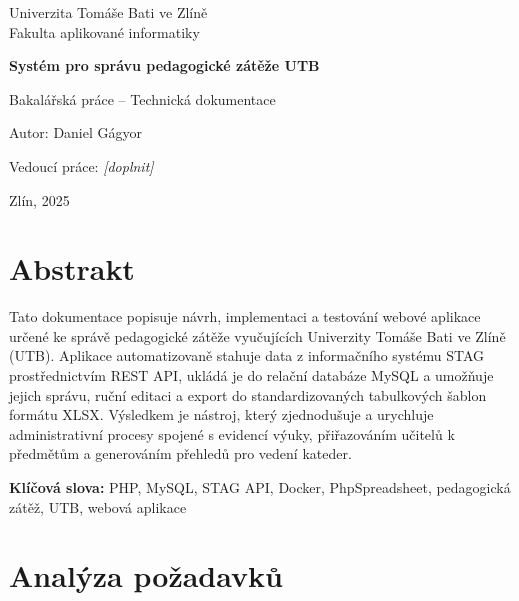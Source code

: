 \documentclass[12pt,a4paper]{report}
\begin{document}

\begin{titlepage}
  \centering
  \vspace*{2cm}
  {\Large Univerzita Tomáše Bati ve Zlíně\\
  Fakulta aplikované informatiky\par}
  \vspace{3cm}
  {\LARGE\bfseries Systém pro správu pedagogické zátěže UTB\par}
  \vspace{1cm}
  {\large Bakalářská práce -- Technická dokumentace\par}
  \vfill
  {\large Autor: Daniel Gágyor\par}
  {\large Vedoucí práce: \textit{[doplnit]}\par}
  \vspace{0.5cm}
  {\large Zlín, 2025\par}
\end{titlepage}

\chapter*{Abstrakt}
Tato dokumentace popisuje návrh, implementaci a testování webové aplikace určené ke správě pedagogické zátěže vyučujících Univerzity Tomáše Bati ve Zlíně (UTB). Aplikace automatizovaně stahuje data z informačního systému STAG prostřednictvím REST API, ukládá je do relační databáze MySQL a umožňuje jejich správu, ruční editaci a export do standardizovaných tabulkových šablon formátu XLSX. Výsledkem je nástroj, který zjednodušuje a urychluje administrativní procesy spojené s evidencí výuky, přiřazováním učitelů k předmětům a generováním přehledů pro vedení kateder.

\vspace{1em}
\textbf{Klíčová slova:} PHP, MySQL, STAG API, Docker, PhpSpreadsheet, pedagogická zátěž, UTB, webová aplikace

\tableofcontents
\listoftables

\newpage

\chapter{Analýza požadavků}
\end{document}
